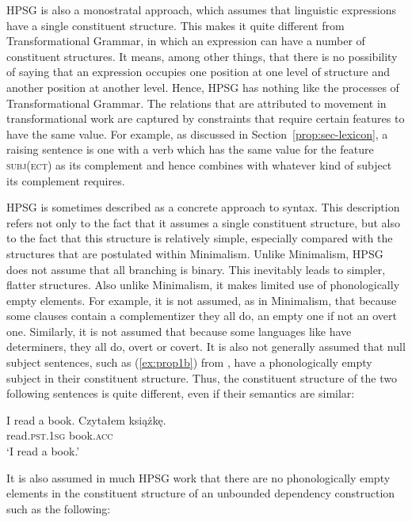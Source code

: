 \documentclass[output=paper
	        ,collection
	        ,collectionchapter
 	        ,biblatex
                ,babelshorthands
                ,newtxmath
                ,draftmode
                ,colorlinks, citecolor=brown
]{langscibook}
\begin{document}
HPSG is also a monostratal approach, which assumes that linguistic expressions have a single constituent structure. This makes it quite different from Transformational Grammar, in which an expression can have a number of constituent structures. It means, among other things, that there is no possibility of saying that an expression occupies one position at one level of structure and another position at another level. Hence, HPSG has nothing like the  processes of Transformational Grammar. The relations that are attributed to movement in transformational work are captured by constraints that require certain features to have the same value. For example, as discussed in Section~\ref{prop:sec-lexicon}, a raising sentence is one with a verb which has the same value for the feature \textsc{subj(ect)} as its complement and hence combines with whatever kind of subject its complement requires.

HPSG is sometimes described as a concrete approach to syntax. This description refers not only to
the fact that it assumes a single constituent structure, but also to the fact that this structure is
relatively simple, especially compared with the structures that are postulated within
Minimalism\indexmp. Unlike Minimalism, HPSG does not assume that all branching
is binary. This inevitably leads to simpler, flatter structures. Also unlike Minimalism, it makes
limited use of phonologically empty elements. For example, it is not assumed, as in Minimalism, that
because some clauses contain a complementizer they all do, an empty one if not an overt
one. Similarly, it is not assumed that because some languages like  have determiners, they
all do, overt or covert. It is also not generally assumed that null subject sentences, such as
(\ref{ex:prop1b}) from , have a phonologically empty subject in their constituent
structure. Thus, the constituent structure of the two following sentences is quite different, even
if their semantics are similar:

\eal\label{ex:prop1}
\ex\label{ex:prop1a}
I read a book.
\ex\label{ex:prop1b}
\gll Czytałem książkę.\\
     read\textsc{.pst.1sg} book\textsc{.acc}\\
\glt `I read a book.'
\zl

\noindent
It is also assumed in much HPSG work that there are no phonologically empty elements in the
constituent structure of an unbounded dependency construction such as the following:
\end{document}
